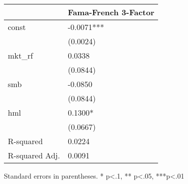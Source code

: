 \begin{table}
\caption{}
\label{}
\begin{center}
\begin{tabular}{ll}
\hline
               & Fama-French 3-Factor  \\
\hline
const          & -0.0071***            \\
               & (0.0024)              \\
mkt\_rf        & 0.0338                \\
               & (0.0844)              \\
smb            & -0.0850               \\
               & (0.0844)              \\
hml            & 0.1300*               \\
               & (0.0667)              \\
R-squared      & 0.0224                \\
R-squared Adj. & 0.0091                \\
\hline
\end{tabular}
\end{center}
\end{table}
\bigskip
Standard errors in parentheses. \newline 
* p<.1, ** p<.05, ***p<.01